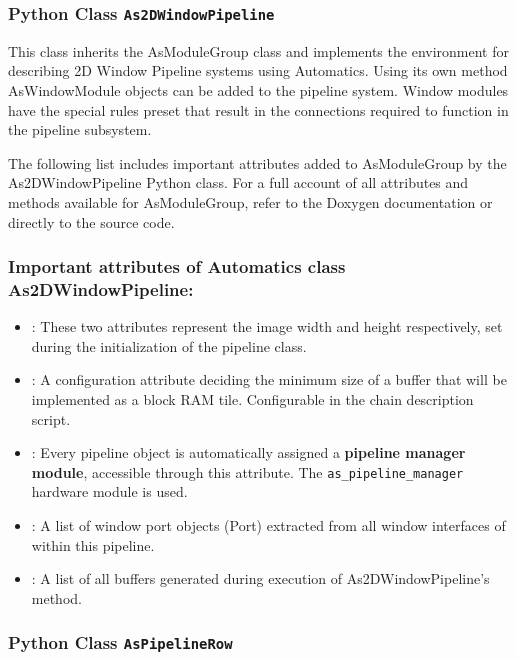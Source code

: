 \subsubsection{Python Class \texttt{As2DWindowPipeline}}
\label{ssec:06-02-2dpipeline_class}

This class inherits the AsModuleGroup class and implements the environment for describing 2D Window Pipeline systems using Automatics.
Using its own  method AsWindowModule objects can be added to the pipeline system.
Window modules have the special rules preset that result in the connections required to function in the pipeline subsystem.

The following list includes important attributes added to AsModuleGroup by the As2DWindowPipeline Python class.
For a full account of all attributes and methods available for AsModuleGroup, refer to the Doxygen documentation or directly to the source code.

\subsubsection*{Important attributes of Automatics class As2DWindowPipeline:}
\begin{itemize}
\item {}: These two attributes represent the image width and height respectively, set during the initialization of the pipeline class.
\item {}: A configuration attribute deciding the minimum size of a buffer that will be implemented as a block RAM tile. Configurable in the chain description script.
\item {}: Every pipeline object is automatically assigned a \textbf{pipeline manager module}, accessible through this attribute. The \texttt{as\_pipeline\_manager} hardware module is used.
\item {}: A list of window port objects (Port) extracted from all window interfaces of within this pipeline.
\item {}: A list of all buffers generated during execution of As2DWindowPipeline's   method.
\end{itemize}

\subsubsection{Python Class \texttt{AsPipelineRow}}

